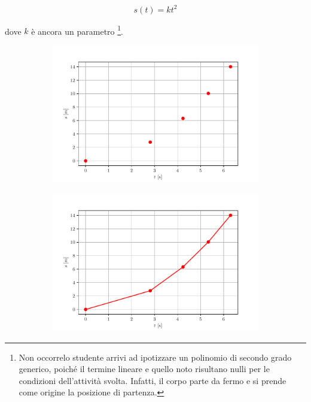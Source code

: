 \documentclass{report} \usepackage[T1]{fontenc} \usepackage[italian]{babel}
\begin{document}
\begin{equation}
s(t) = kt^2
\end{equation}

dove $k$ è ancora un parametro
\footnote{
          Non occorrelo studente arrivi ad ipotizzare un polinomio di secondo grado generico,
          poiché il termine lineare e quello noto risultano nulli per le condizioni
          dell’attività svolta. Infatti, il corpo parte da fermo e si prende come origine
          la posizione di partenza.
         }.

\begin{figure}[H]
\centering
  \begin{subfigure}[b]{0.49\textwidth}
  \includegraphics[width=\textwidth]{s-t_parabola1}
  \end{subfigure}
  \begin{subfigure}[b]{0.49\textwidth}
  \includegraphics[width=\textwidth]{s-t_parabola2}

\end{subfigure}
\end{figure}
\end{document}
